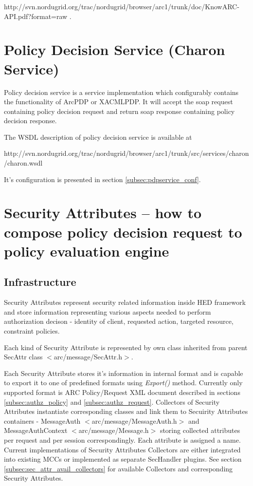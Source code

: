 \documentclass{article}                            %
\begin{document}
http://svn.nordugrid.org/trac/nordugrid/browser/arc1/trunk/doc/KnowARC-API.pdf?format=raw .



\section{Policy Decision Service (Charon Service)} %
\label{sec:policy_decision_service}
Policy decision service is a service implementation which configurably contains the functionality of ArcPDP or XACMLPDP. It will accept the soap request containing policy decision request and return soap response containing policy decision response.

The WSDL description of policy decision service is available at

 http://svn.nordugrid.org/trac/nordugrid/browser/arc1/trunk/src/services/charon/charon.wsdl

It's configuration is presented in section \ref{subsec:pdpservice_conf}.



\section{Security Attributes -- how to compose policy decision request to policy evaluation engine} %
\label{sec:sec_attributes}

\subsection{Infrastructure} %
\label{subsec:sec_attr_infrastructure}

Security Attributes represent security related information inside HED framework and store information representing various aspects needed to perform authorization decison - identity of client, requested action, targeted resource, constraint policies.

Each kind of Security Attribute is represented by own class inherited from parent SecAttr class $<$arc/message/SecAttr.h$>$.

Each Security Attribute stores it's information in internal format and is capable to export it to one of predefined formats using \textit{Export()} method. Currently only supported format is ARC Policy/Request XML document described in sections \ref{subsec:authz_policy} and \ref{subsec:authz_request}.
Collectors of Security Attributes instantiate corresponding classes and link them to Secuirity Attributes containers - MessageAuth $<$arc/message/MessageAuth.h$>$ and MessageAuthContext $<$arc/message/Message.h$>$ storing collected attributes per request and per session correspondingly. Each attribute is assigned a name. Current implementations of Security Attributes Collectors are either integrated into existing MCCs or implemented as separate SecHandler plugins. See section \ref{subsec:sec_attr_avail_collectors} for available Collectors and corresponding Security Attributes.
\end{document}
